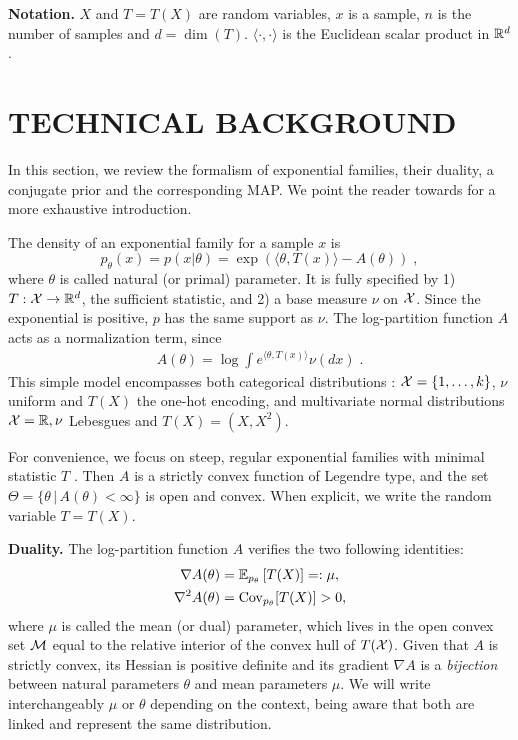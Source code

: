 \documentclass[twoside]{article}
\let\oldsection\section
\renewcommand{\section}[1]{\oldsection{\texorpdfstring{\uppercase{#1}}{#1}}}
\newcommand*{\expect}[2][]{\ensuremath{\mathbb{E}_{#1} \left[ #2 \right] }} %
\newcommand{\cond}{\,\vert\,}
\newcommand{\logpart}{A}
\newcommand{\nat}{\theta}
\newcommand{\m}{\mu}
\newcommand{\meanp}{\m}
\begin{document}
{\bf Notation.}
$X$ and $T=T(X)$ are random variables, $x$ is a sample, $n$ is the number of samples and $d= \dim(T)$.
$\langle \cdot , \cdot \rangle$ is the Euclidean scalar product in $\mathbb{R}^d$.


\section{Technical background}
\label{sec:background}
In this section, we review the formalism of exponential families, their duality, a conjugate prior and the corresponding MAP.
We point the reader towards \citet[Chapter 3]{wainwright2008graphical} for a more exhaustive introduction.


The density of an exponential family for a sample $x$ is
\begin{equation}
	 p_\nat(x) = p(x|\nat) = \exp( \langle \nat, T(x) \rangle - \logpart(\nat)) \; ,
	 \label{eq:def_expfamily}
\end{equation}
where  $\nat$ is called natural (or primal) parameter.
It is fully specified by 1) $T: {\mathcal X} \rightarrow \mathbb{R}^d$, the sufficient statistic,
and 2) a base measure $\nu$ on ${\mathcal X}$.
Since the exponential is positive, $p$ has the same support as $\nu$.
The log-partition function $\logpart$ acts as a normalization term, since
\begin{align}
    \logpart(\nat) = \log \int e^{\langle \nat, T(x) \rangle} \nu(dx) \;.
\end{align}
This simple model encompasses both categorical distributions : ${\mathcal X} = \{1, \dots, k\}$, $\nu$ uniform and $T(X)$  the one-hot encoding, and multivariate normal distributions ${\mathcal X}=\mathbb{R}, \nu$ Lebesgues and $T(X)=(X, X^2)$.

For convenience, we focus on steep, regular exponential families with minimal statistic $T$ \citep{barndoffnielsen2014information}.
Then $\logpart$ is a strictly convex function of Legendre type,
and the set $\Theta = \{ \nat \cond \logpart(\nat) < \infty\}$ is open and convex.
When explicit, we write the random variable $T = T(X)$.


{\bf Duality.}
The log-partition function $\logpart$ verifies the two following identities:
\begin{align}
    \nabla\logpart(\nat) &=  \expect[p_\nat]{T(X)} =: \meanp, \\
    \nabla^2 \logpart(\nat) &= \Cov_{p_\nat}[T(X)] > 0,
\end{align}
where $\meanp$ is called the mean (or dual) parameter, which lives in the open convex set ${\mathcal M}$ equal to the relative interior of the convex hull of $T({\mathcal X})$.
Given that $\logpart$ is strictly convex, its Hessian is positive definite and its gradient $\nabla \logpart$ is a \textit{bijection} between natural parameters $\nat$ and mean parameters $\m$.
We will write interchangeably $\m$ or  $\nat$ depending on the context, being aware that both are linked and represent the same distribution.
\end{document}
